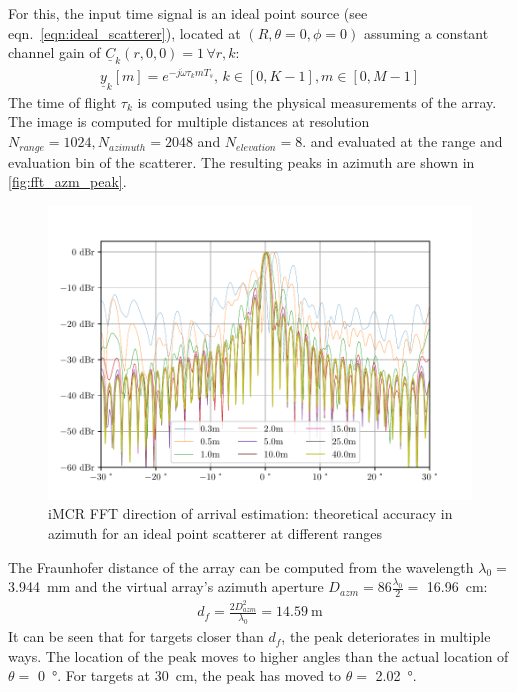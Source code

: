 For this, the input time signal is an ideal point source (see eqn.\ \ref{eqn:ideal_scatterer}),
located at $(R,\theta=0,\phi=0)$
assuming a constant channel gain of $\underline C_k(r,0,0)=1 \,\forall r,k$:
\begin{align}
    \underline y_k[m] =  e^{-j\dot \omega \tau_k m T_s}    ,\,k\in[0,K-1],m\in[0,M-1]
\end{align}
The time of flight $\tau_k$ is computed using the physical measurements of the array.
\\
The image is computed for multiple distances at resolution
$N_{range} = 1024, N_{azimuth} = 2048$ and $N_{elevation} = 8$.
and evaluated at the range and evaluation bin of the scatterer.
The resulting peaks in azimuth are shown in \autoref{fig:fft_azm_peak}.
\begin{figure}[h]
    \centering
    \includegraphics[width=\textwidth]{../figures/fft_azm_peak.pdf}
    \caption{iMCR FFT direction of arrival estimation: theoretical accuracy in azimuth for an ideal point scatterer at different ranges}
    \label{fig:fft_azm_peak}
\end{figure}

The Fraunhofer distance of the array can be computed from the wavelength $\lambda_0=$ \SIlist{3.944}{\mm}
and the virtual array's azimuth aperture $D_{azm} = 86 \frac{\lambda_0}{2}=$ \SI{16.96}{\cm}:
\begin{align}
    d_f  = \frac{2D_{azm}^2}{\lambda_0}
    = \SI{14.59}{\m}
\end{align}
It can be seen that for targets closer than $d_f$, the peak deteriorates in multiple ways.
The location of the peak moves to higher angles than the actual location of $\theta =$ \SI{0}{\degree}.
For targets at \SI{30}{\cm}, the peak has moved to $\theta =$ \SI{2.02}{\degree}.

